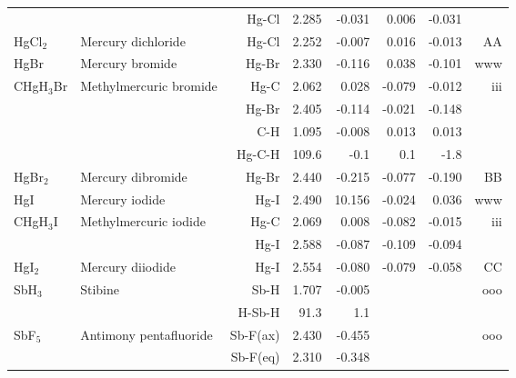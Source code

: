 \begin{table}
\begin{center}
\begin{tabular}{llrrrrrr}
             &                                    &Hg-Cl          &     2.285   &    -0.031 &     0.006 &    -0.031 &       \\
 HgCl$_2$       & Mercury dichloride                 &Hg-Cl          &     2.252   &    -0.007 &     0.016 &    -0.013 &    AA \\
 HgBr        & Mercury bromide                    &Hg-Br          &     2.330   &    -0.116 &     0.038 &    -0.101 &   www \\
 CHgH$_3$Br     & Methylmercuric bromide             &Hg-C           &     2.062   &     0.028 &    -0.079 &    -0.012 &   iii \\
             &                                    &Hg-Br          &     2.405   &    -0.114 &    -0.021 &    -0.148 &       \\
             &                                    &C-H            &     1.095   &    -0.008 &     0.013 &     0.013 &       \\
             &                                    &Hg-C-H       &     109.6   &      -0.1 &       0.1 &      -1.8   &       \\
 HgBr$_2$       & Mercury dibromide                  &Hg-Br          &     2.440   &    -0.215 &    -0.077 &    -0.190 &    BB \\
 HgI         & Mercury iodide                     &Hg-I           &     2.490   &    10.156 &    -0.024 &     0.036 &   www \\
 CHgH$_3$I      & Methylmercuric iodide              &Hg-C           &     2.069   &     0.008 &    -0.082 &    -0.015 &   iii \\
             &                                    &Hg-I           &     2.588   &    -0.087 &    -0.109 &    -0.094 &       \\
 HgI$_2$        & Mercury diiodide                   &Hg-I           &     2.554   &    -0.080 &    -0.079 &    -0.058 &    CC \\
 SbH$_3$        & Stibine                            &Sb-H           &     1.707   &    -0.005 &  &  &   ooo \\
             &                                    &H-Sb-H       &      91.3   &       1.1 &  &    &       \\
 SbF$_5$        & Antimony pentafluoride             &Sb-F(ax)       &     2.430   &    -0.455 &  &  &   ooo \\
             &                                    &Sb-F(eq)       &     2.310   &    -0.348 &  &  &       \\

\end{tabular}
\end{center}
\end{table}

